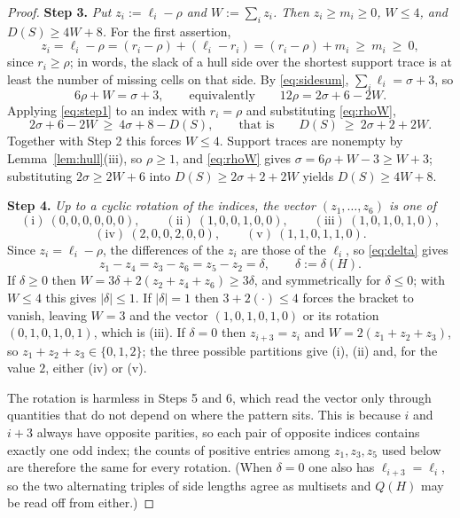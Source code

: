 \documentclass[11pt]{article}
\theoremstyle{plain}
\theoremstyle{definition}
\theoremstyle{remark}
\begin{document}
\begin{proof}
\medskip\noindent\textbf{Step 3.} \emph{Put \(z_{i}:=\ell_{i}-\rho\) and
\(W:=\sum_{i}z_{i}\). Then \(z_{i}\ge m_{i}\ge0\), \(W\le4\), and \(D(S)\ge4W+8\).}
For the first assertion,
\[
   z_{i}=\ell_{i}-\rho=(r_{i}-\rho)+(\ell_{i}-r_{i})=(r_{i}-\rho)+m_{i}\ \ge\ m_{i}\ \ge\ 0,
\]
since \(r_{i}\ge\rho\); in words, the slack of a hull side over the shortest support trace
is at least the number of missing cells on that side. By \eqref{eq:sidesum},
\(\sum_{i}\ell_{i}=\sigma+3\), so
\begin{equation}\label{eq:rhoW}
   6\rho+W=\sigma+3,\qquad\text{equivalently}\qquad 12\rho=2\sigma+6-2W .
\end{equation}
Applying \eqref{eq:step1} to an index with \(r_{i}=\rho\) and substituting
\eqref{eq:rhoW},
\[
   2\sigma+6-2W\ \ge\ 4\sigma+8-D(S),\qquad\text{that is}\qquad D(S)\ \ge\ 2\sigma+2+2W .
\]
Together with Step 2 this forces \(W\le4\). Support traces are nonempty by
Lemma~\ref{lem:hull}(iii), so \(\rho\ge1\), and \eqref{eq:rhoW} gives
\(\sigma=6\rho+W-3\ge W+3\); substituting \(2\sigma\ge2W+6\) into
\(D(S)\ge2\sigma+2+2W\) yields \(D(S)\ge4W+8\).

\medskip\noindent\textbf{Step 4.} \emph{Up to a cyclic rotation of the indices, the vector
\((z_{1},\dots,z_{6})\) is one of}
\[
   \mathrm{(i)}\ (0,0,0,0,0,0),\qquad
   \mathrm{(ii)}\ (1,0,0,1,0,0),\qquad
   \mathrm{(iii)}\ (1,0,1,0,1,0),
\]
\[
   \mathrm{(iv)}\ (2,0,0,2,0,0),\qquad
   \mathrm{(v)}\ (1,1,0,1,1,0).
\]
Since \(z_{i}=\ell_{i}-\rho\), the differences of the \(z_{i}\) are those of the
\(\ell_{i}\), so \eqref{eq:delta} gives
\[
   z_{1}-z_{4}=z_{3}-z_{6}=z_{5}-z_{2}=\delta,\qquad \delta:=\delta(H).
\]
If \(\delta\ge0\) then \(W=3\delta+2(z_{2}+z_{4}+z_{6})\ge3\delta\), and symmetrically for
\(\delta\le0\); with \(W\le4\) this gives \(|\delta|\le1\). If \(|\delta|=1\) then
\(3+2(\cdot)\le4\) forces the bracket to vanish, leaving \(W=3\) and the vector
\((1,0,1,0,1,0)\) or its rotation \((0,1,0,1,0,1)\), which is (iii). If \(\delta=0\) then
\(z_{i+3}=z_{i}\) and \(W=2(z_{1}+z_{2}+z_{3})\), so \(z_{1}+z_{2}+z_{3}\in\{0,1,2\}\); the
three possible partitions give (i), (ii) and, for the value \(2\), either (iv) or (v).

The rotation is harmless in Steps 5 and 6, which read the vector only through quantities
that do not depend on where the pattern sits. This is because \(i\) and \(i+3\) always have
opposite parities, so each pair of opposite indices contains exactly one odd index; the
counts of positive entries among \(z_{1},z_{3},z_{5}\) used below are therefore the same
for every rotation. (When \(\delta=0\) one also has \(\ell_{i+3}=\ell_{i}\), so the two
alternating triples of side lengths agree as multisets and \(Q(H)\) may be read off from
either.)


\end{proof}
\end{document}
